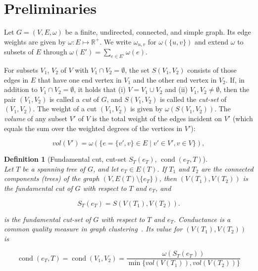 \documentclass[pdftex]{llncs}
\newtheorem{consDefinition}[example]{Definition}
\newcommand{\cond}{\operatorname{cond}}
\newcommand{\RR}{\mathbb{R}}
\numberwithin{equation}{section}
\numberwithin{example}{section}
\numberwithin{table}{section}
\begin{document}
\section{Preliminaries}
\label{sec:prelim}
Let $G=(V,E, \omega)$ be a finite, undirected, connected, and simple
graph. Its edge weights are given by $\omega: E \mapsto \RR^+$. We
write $\omega_{u,v}$ for $\omega(\{u, v\})$ and extend $\omega$ to
subsets of $E$ through $\omega(E') = \sum_{e \in E'} \omega(e)$.

For subsets $V_1$, $V_2$ of $V$ with $V_1 \cap V_2 = \emptyset$, the
set $S(V_1, V_2)$ consists of those edges in $E$ that have one end
vertex in $V_1$ and the other end vertex in $V_2$. If, in addition to
$V_1 \cap V_2 = \emptyset$, it holds that (i) $V = V_1 \cup V_2$ and
(ii) $V_1, V_2 \not= \emptyset$, then the pair $(V_1,V_2)$ is called a
{\em cut} of $G$, and $S(V_1, V_2)$ is called the {\em cut-set} of
$(V_1,V_2)$. The weight of a cut $(V_1,V_2)$ is given by
$\omega(S(V_1, V_2))$. The \emph{volume} of any subset $V'$ of $V$ is
the total weight of the edges incident on $V'$ (which equals the sum over the
weighted degrees of the vertices in $V'$):

\begin{equation}
\label{eq:def:vol}
vol(V') = \omega(\{e=\{v', v\} \in E \mid v' \in V', v \in V\}),
\end{equation}

\begin{consDefinition}[Fundamental cut, cut-set $S_T(e_T)$, $\cond(e_T, T)$]~\\
\label{nota:funda_condu}
\noindent Let $T$ be a spanning tree of $G$, and let $e_T \in
E(T)$. If $T_1$ and $T_2$ are the connected components (trees) of the
graph $(V, E(T) \setminus \{e_T\})$, then $(V(T_1), V(T_2))$ is the
fundamental cut of $G$ with respect to $T$ and $e_T$, and

\begin{equation}
\label{eq:funda}
S_T(e_T) = S(V(T_1), V(T_2)).
\end{equation}

\noindent is the fundamental cut-set of $G$ with respect to $T$ and
$e_T$. Conductance is a common quality measure in graph
clustering~\cite{Kannan04clustering}. Its value for $(V(T_1), V(T_2))$ is

\begin{equation}
\label{eq:condu}
\cond(e_T, T) = \cond(V_1, V_2) = \frac{\omega(S_T(e_T))}{\min\{vol(V(T_1)), vol(V(T_2))\}}
\end{equation}

\end{consDefinition}
\end{document}
